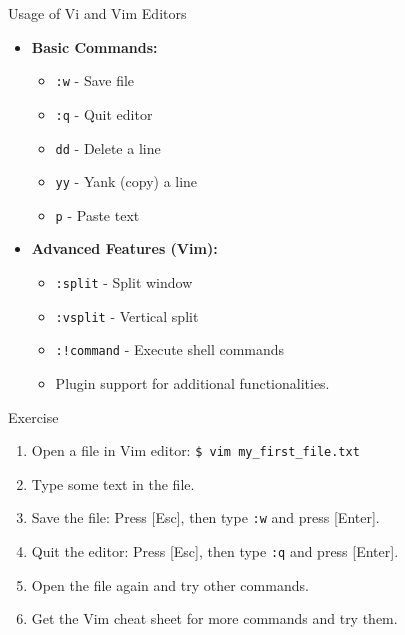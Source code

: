 \documentclass[aspectratio=169]{beamer}
\begin{document}
\begin{frame}{Usage of Vi and Vim Editors}
    \begin{itemize}
        \item \textbf{Basic Commands:} 
        \begin{itemize}
            \item \texttt{:w} - Save file
            \item \texttt{:q} - Quit editor
            \item \texttt{dd} - Delete a line
            \item \texttt{yy} - Yank (copy) a line
            \item \texttt{p} - Paste text
        \end{itemize}
        \item \textbf{Advanced Features (Vim):} 
        \begin{itemize}
            \item \texttt{:split} - Split window
            \item \texttt{:vsplit} - Vertical split
            \item \texttt{:!command} - Execute shell commands
            \item Plugin support for additional functionalities.
        \end{itemize}
    \end{itemize}
\end{frame}


\begin{frame}
    \begin{block}{Exercise}
        \begin{enumerate}
            \item Open a file in Vim editor: \texttt{\$ vim my\_first\_file.txt}
            \item Type some text in the file.
            \item Save the file: Press [Esc], then type \texttt{:w} and press [Enter].
            \item Quit the editor: Press [Esc], then type \texttt{:q} and press [Enter].
            \item Open the file again and try other commands.
            \item Get the Vim cheat sheet for more commands and try them.
        \end{enumerate}
    \end{block}
\end{frame}
\end{document}
